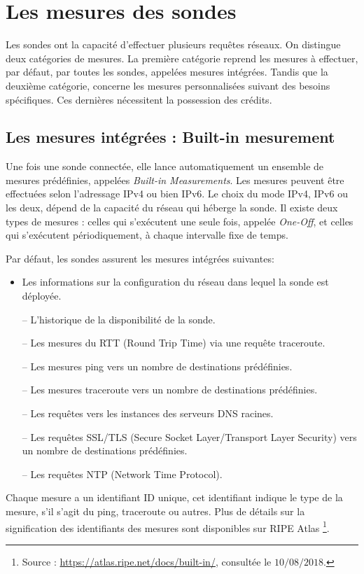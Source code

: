 
\section{Les mesures des sondes}
Les sondes ont la capacité d'effectuer plusieurs requêtes  réseaux. On distingue deux catégories de mesures. La première catégorie reprend les mesures à effectuer, par défaut, par toutes les sondes, appelées  mesures intégrées. Tandis que la deuxième catégorie, concerne les mesures personnalisées suivant des besoins spécifiques. Ces dernières nécessitent la possession des crédits.
\subsection{Les mesures intégrées : Built-in mesurement } \label{par:whatmesureripeatlas}
Une fois une sonde  connectée, elle lance automatiquement un ensemble de mesures prédéfinies, appelées \textit{Built-in Measurements}. Les mesures peuvent être effectuées selon l'adressage IPv4 ou bien IPv6. Le choix du mode  IPv4,  IPv6 ou les deux, dépend de la capacité du réseau qui héberge la sonde.  Il existe deux types de mesures :  celles qui   s'exécutent une seule fois, appelée  \textit{One-Off}, et celles qui s'exécutent   périodiquement, à chaque intervalle fixe de temps. 

Par défaut, les sondes  assurent les mesures intégrées  suivantes: 
\begin{itemize}
	\item Les informations sur la configuration du réseau dans lequel la sonde  est déployée.
	\item[--] L'historique de la disponibilité de la sonde.
	\item[--] Les mesures du  RTT (Round Trip Time) via une requête traceroute.
	\item[--] Les mesures ping vers un nombre de destinations prédéfinies.
	\item[--] Les mesures traceroute vers un nombre de destinations prédéfinies.
	\item[--] Les requêtes vers les instances des serveurs DNS  racines.
	\item[--] Les requêtes SSL/TLS (Secure Socket Layer/Transport Layer Security) vers un nombre de destinations prédéfinies.
	\item[--] Les requêtes NTP (Network Time Protocol).
\end{itemize}

Chaque mesure a un identifiant ID unique, cet identifiant indique le type de la mesure, s'il s'agit du ping, traceroute ou autres. Plus de détails sur la signification des identifiants des mesures sont disponibles sur RIPE Atlas \footnote{Source : \url{https://atlas.ripe.net/docs/built-in/}, consultée le $10/08/2018$.}.
